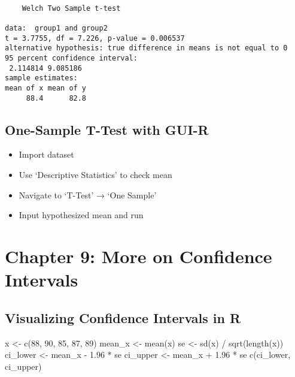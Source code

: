 \documentclass[
  letterpaper,
  DIV=11,
  numbers=noendperiod]{scrreprt}
\newenvironment{Shaded}{\begin{snugshade}}{\end{snugshade}}
\newcommand{\DecValTok}[1]{\textcolor[rgb]{0.68,0.00,0.00}{#1}}
\newcommand{\FloatTok}[1]{\textcolor[rgb]{0.68,0.00,0.00}{#1}}
\newcommand{\FunctionTok}[1]{\textcolor[rgb]{0.28,0.35,0.67}{#1}}
\newcommand{\NormalTok}[1]{\textcolor[rgb]{0.00,0.23,0.31}{#1}}
\newcommand{\OtherTok}[1]{\textcolor[rgb]{0.00,0.23,0.31}{#1}}
\newcommand{\SpecialCharTok}[1]{\textcolor[rgb]{0.37,0.37,0.37}{#1}}
\providecommand{\tightlist}{%
  \setlength{\itemsep}{0pt}\setlength{\parskip}{0pt}}
\begin{document}
\begin{verbatim}

    Welch Two Sample t-test

data:  group1 and group2
t = 3.7755, df = 7.226, p-value = 0.006537
alternative hypothesis: true difference in means is not equal to 0
95 percent confidence interval:
 2.114814 9.085186
sample estimates:
mean of x mean of y 
     88.4      82.8 
\end{verbatim}

\subsection{One-Sample T-Test with
GUI-R}\label{one-sample-t-test-with-gui-r}

\begin{itemize}
\tightlist
\item
  Import dataset
\item
  Use `Descriptive Statistics' to check mean
\item
  Navigate to `T-Test' → `One Sample'
\item
  Input hypothesized mean and run
\end{itemize}

\section{Chapter 9: More on Confidence
Intervals}\label{chapter-9-more-on-confidence-intervals}

\subsection{Visualizing Confidence Intervals in
R}\label{visualizing-confidence-intervals-in-r}

\begin{Shaded}
\begin{Highlighting}[]
\NormalTok{x }\OtherTok{\textless{}{-}} \FunctionTok{c}\NormalTok{(}\DecValTok{88}\NormalTok{, }\DecValTok{90}\NormalTok{, }\DecValTok{85}\NormalTok{, }\DecValTok{87}\NormalTok{, }\DecValTok{89}\NormalTok{)}
\NormalTok{mean\_x }\OtherTok{\textless{}{-}} \FunctionTok{mean}\NormalTok{(x)}
\NormalTok{se }\OtherTok{\textless{}{-}} \FunctionTok{sd}\NormalTok{(x) }\SpecialCharTok{/} \FunctionTok{sqrt}\NormalTok{(}\FunctionTok{length}\NormalTok{(x))}
\NormalTok{ci\_lower }\OtherTok{\textless{}{-}}\NormalTok{ mean\_x }\SpecialCharTok{{-}} \FloatTok{1.96} \SpecialCharTok{*}\NormalTok{ se}
\NormalTok{ci\_upper }\OtherTok{\textless{}{-}}\NormalTok{ mean\_x }\SpecialCharTok{+} \FloatTok{1.96} \SpecialCharTok{*}\NormalTok{ se}
\FunctionTok{c}\NormalTok{(ci\_lower, ci\_upper)}
\end{Highlighting}
\end{Shaded}
\end{document}
